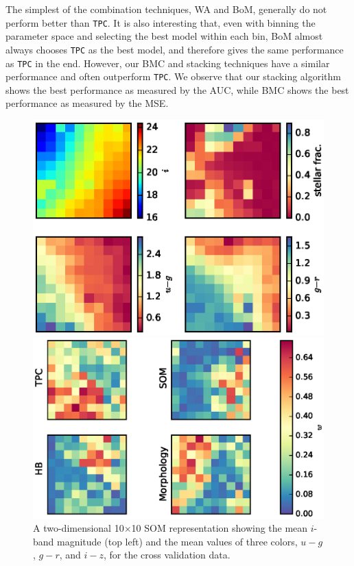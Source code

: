 \documentclass[useAMS,usenatbib]{mn2e}
\begin{document}
The simplest of the combination techniques, WA and BoM,
generally do not perform better than \texttt{TPC}.
It is also interesting that,
even with binning the parameter space and selecting the best model
within each bin,
BoM almost always chooses \texttt{TPC} as the best model,
and therefore gives the same performance as \texttt{TPC} in the end.
However, our BMC and stacking techniques have a similar performance
and often outperform \texttt{TPC}.
We observe that our stacking algorithm shows the best performance
as measured by the AUC,
while BMC shows the best performance
as measured by the MSE.

\begin{figure}
  \begin{minipage}[b]{0.49\linewidth}
    \includegraphics[width=\textwidth]{figures/som_colors.eps}
    \caption{A two-dimensional 10$\times$10 SOM representation
             showing the mean $i$-band magnitude (top left) and
             the mean values of three colors,
             $u-g$, $g-r$, and $i-z$,
             for the cross validation data.}
    \label{fig:som_colors}
  \end{minipage}
  \hfill
  \begin{minipage}[b]{0.49\linewidth}
    \includegraphics[width=\textwidth]{figures/weights.eps}

\end{minipage}
\end{figure}
\end{document}
